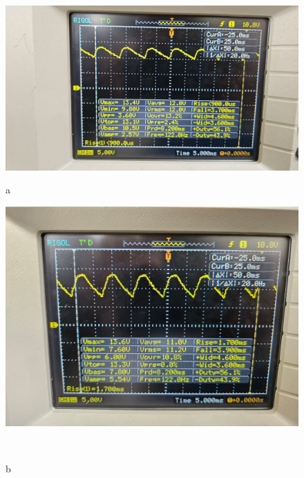 \documentclass[10pt,letterpaper]{article}
\begin{document}
\begin{figure}[H]
    \centering
    \begin{minipage}[b]{0.45\textwidth}
        \centering
        \includegraphics[scale=0.2]{Filtrado0.jpg}
        \caption*{a}
    \end{minipage}
    \hfill
    \begin{minipage}[b]{0.45\textwidth}
        \centering
        \includegraphics[scale=0.15]{Filtrado7.jpg}
        \caption*{b}
    \end{minipage}
    \\


\end{figure}
\end{document}
